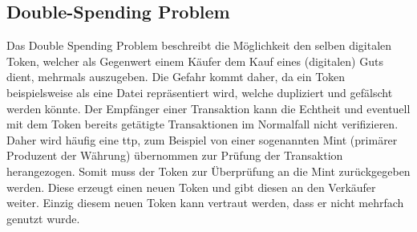 \subsection{Double-Spending Problem}
\label{sec:sota_doublespend}
	Das Double Spending Problem beschreibt die Möglichkeit den selben digitalen Token, welcher als Gegenwert einem Käufer dem Kauf eines (digitalen) Guts dient, mehrmals auszugeben\cite{Chohan2017}.
	Die Gefahr kommt daher, da ein Token beispielsweise als eine Datei repräsentiert wird, welche dupliziert und gefälscht werden könnte\cite{Chohan2017}.
	Der Empfänger einer Transaktion kann die Echtheit und eventuell mit dem Token bereits getätigte Transaktionen im Normalfall nicht verifizieren\cite{Nakamoto2008}.
	Daher wird häufig eine \gls{ttp}, zum Beispiel von einer sogenannten Mint (primärer Produzent der Währung) übernommen zur Prüfung der Transaktion herangezogen\cite{Nakamoto2008}.
	Somit muss der Token zur Überprüfung an die Mint zurückgegeben werden. 
	Diese erzeugt einen neuen Token und gibt diesen an den Verkäufer weiter.
	Einzig diesem neuen Token kann vertraut werden, dass er nicht mehrfach genutzt wurde\cite{Nakamoto2008}.